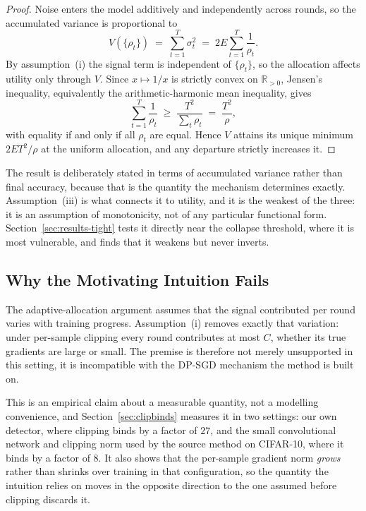 \begin{proof}
Noise enters the model additively and independently across rounds, so the
accumulated variance is proportional to
\begin{equation}
  V(\{\rho_t\}) \;=\; \sum_{t=1}^{T}\sigma_t^{2}
  \;=\; 2E\sum_{t=1}^{T}\frac{1}{\rho_t}.
  \label{eq:variance}
\end{equation}
By assumption~(i) the signal term is independent of $\{\rho_t\}$, so the
allocation affects utility only through $V$. Since $x\mapsto 1/x$ is strictly
convex on $\mathbb{R}_{>0}$, Jensen's inequality, equivalently the
arithmetic-harmonic mean inequality, gives
\begin{equation}
  \sum_{t=1}^{T}\frac{1}{\rho_t} \;\ge\; \frac{T^{2}}{\sum_t \rho_t}
  \;=\; \frac{T^{2}}{\rho},
  \label{eq:amhm}
\end{equation}
with equality if and only if all $\rho_t$ are equal. Hence $V$ attains its
unique minimum $2ET^{2}/\rho$ at the uniform allocation, and any departure
strictly increases it.
\end{proof}

\vspace{10pt}

The result is deliberately stated in terms of accumulated variance rather than
final accuracy, because that is the quantity the mechanism determines exactly.
Assumption~(iii) is what connects it to utility, and it is the weakest of the
three: it is an assumption of monotonicity, not of any particular functional
form. Section~\ref{sec:results-tight} tests it directly near the collapse
threshold, where it is most vulnerable, and finds that it weakens but never
inverts.

\subsection{Why the Motivating Intuition Fails}

The adaptive-allocation argument assumes that the signal contributed per round
varies with training progress. Assumption~(i) removes exactly that variation:
under per-sample clipping every round contributes at most $C$, whether its true
gradients are large or small. The premise is therefore not merely unsupported in
this setting, it is incompatible with the DP-SGD mechanism the method is built
on.

\vspace{10pt}

This is an empirical claim about a measurable quantity, not a modelling
convenience, and Section~\ref{sec:clipbinds} measures it in two settings: our
own detector, where clipping binds by a factor of $27$, and the small
convolutional network and clipping norm used by the source method on CIFAR-10,
where it binds by a factor of $8$. It also shows that the per-sample gradient
norm \emph{grows} rather than shrinks over training in that configuration, so
the quantity the intuition relies on moves in the opposite direction to the one
assumed before clipping discards it.

